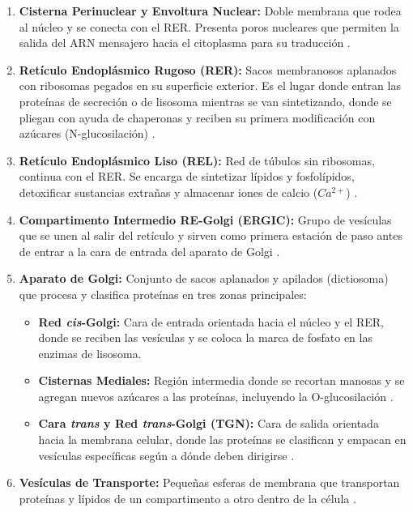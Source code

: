 \documentclass[spanish,letterpaper,oneside]{article}
\begin{document}
\begin{enumerate}
    \item \textbf{Cisterna Perinuclear y Envoltura Nuclear:} Doble membrana que rodea al núcleo y se conecta con el RER. Presenta poros nucleares que permiten la salida del ARN mensajero hacia el citoplasma para su traducción \parencite{fortoul2020histologia}.
    \item \textbf{Retículo Endoplásmico Rugoso (RER):} Sacos membranosos aplanados con ribosomas pegados en su superficie exterior. Es el lugar donde entran las proteínas de secreción o de lisosoma mientras se van sintetizando, donde se pliegan con ayuda de chaperonas y reciben su primera modificación con azúcares (N-glucosilación) \parencite{salazar2018biologia}.
    \item \textbf{Retículo Endoplásmico Liso (REL):} Red de túbulos sin ribosomas, continua con el RER. Se encarga de sintetizar lípidos y fosfolípidos, detoxificar sustancias extrañas y almacenar iones de calcio ($Ca^{2+}$) \parencite{karp2019biologia}.
    \item \textbf{Compartimento Intermedio RE-Golgi (ERGIC):} Grupo de vesículas que se unen al salir del retículo y sirven como primera estación de paso antes de entrar a la cara de entrada del aparato de Golgi \parencite{alberts2022molecular}.
    \item \textbf{Aparato de Golgi:} Conjunto de sacos aplanados y apilados (dictiosoma) que procesa y clasifica proteínas en tres zonas principales:
    \begin{itemize}
        \item \textbf{Red \textit{cis}-Golgi:} Cara de entrada orientada hacia el núcleo y el RER, donde se reciben las vesículas y se coloca la marca de fosfato en las enzimas de lisosoma.
        \item \textbf{Cisternas Mediales:} Región intermedia donde se recortan manosas y se agregan nuevos azúcares a las proteínas, incluyendo la O-glucosilación \parencite{mathews2013bioquimica}.
        \item \textbf{Cara \textit{trans} y Red \textit{trans}-Golgi (TGN):} Cara de salida orientada hacia la membrana celular, donde las proteínas se clasifican y empacan en vesículas específicas según a dónde deben dirigirse \parencite{fortoul2020histologia}.
    \end{itemize}
    \item \textbf{Vesículas de Transporte:} Pequeñas esferas de membrana que transportan proteínas y lípidos de un compartimento a otro dentro de la célula \parencite{lodish2021molecular}.

\end{enumerate}
\end{document}
